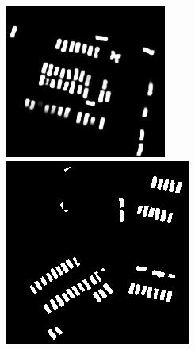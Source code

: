 \documentclass{kththesis}
\begin{document}
\begin{figure}[H]
  \includegraphics[width=\linewidth]{gan_vs_class/gan_1}
\endminipage\hfill
\vspace{1ex}
  \includegraphics[width=\linewidth]{gan_vs_class/label_2}
\endminipage\hfill

\end{figure}
\end{document}
